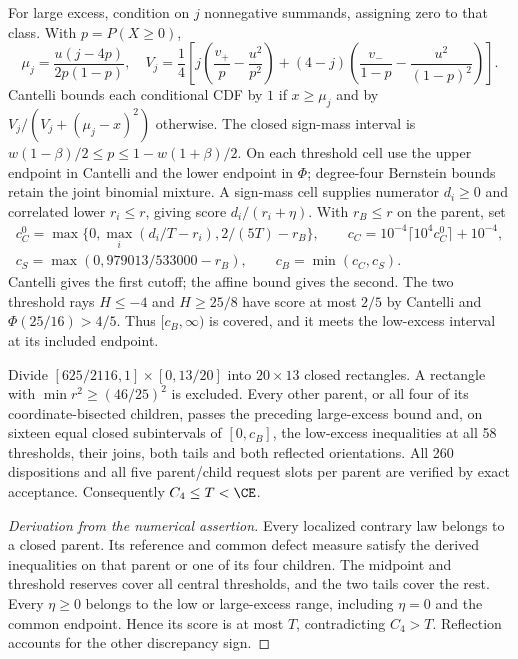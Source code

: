 For large excess, condition on $j$ nonnegative summands, assigning
zero to that class. With $p=P(X\ge0)$,
\[
 \mu_j=\frac{u(j-4p)}{2p(1-p)},\quad
 V_j=\frac14\left[j\left(\frac{v_+}{p}-\frac{u^2}{p^2}\right)
 +(4-j)\left(\frac{v_-}{1-p}-\frac{u^2}{(1-p)^2}\right)\right].
\]
Cantelli bounds each conditional CDF by $1$ if $x\ge\mu_j$ and by
$V_j/(V_j+(\mu_j-x)^2)$ otherwise. The closed sign-mass interval is
$w(1-\beta)/2\le p\le1-w(1+\beta)/2$.
On each threshold cell use the upper endpoint in Cantelli and the
lower endpoint in $\Phi$; degree-four Bernstein bounds retain the
joint binomial mixture. A sign-mass cell supplies numerator $d_i\ge0$
and correlated lower $r_i\le r$, giving score $d_i/(r_i+\eta)$.
With $r_B\le r$ on the parent, set
\begin{gather*}
 c_C^0=\max\{0,\max_i(d_i/T-r_i),2/(5T)-r_B\},\qquad
 c_C=10^{-4}\lceil10^4c_C^0\rceil+10^{-4},\\
 c_S=\max(0,979013/533000-r_B),\qquad c_B=\min(c_C,c_S).
\end{gather*}
Cantelli gives the first cutoff; the affine bound gives the second.
The two threshold rays $H\le-4$ and $H\ge25/8$ have score at most
$2/5$ by Cantelli and $\Phi(25/16)>4/5$. Thus $[c_B,\infty)$ is
covered, and it meets the low-excess interval at its included endpoint.

\begin{proposition}\label{j:finite:n4numerical}
Divide $[625/2116,1]\times[0,13/20]$ into $20\times13$ closed
rectangles. A rectangle with $\min r^2\ge(46/25)^2$ is excluded.
Every other parent, or all four of its coordinate-bisected children,
passes the preceding large-excess bound and, on sixteen equal closed
subintervals of $[0,c_B]$, the low-excess inequalities at all 58
thresholds, their joins, both tails and both reflected orientations.
All 260 dispositions and all five parent/child request slots per parent
are verified by exact acceptance. Consequently $C_4\le T<\CE$.
\end{proposition}
\begin{proof}[Derivation from the numerical assertion]
Every localized contrary law belongs to a closed parent. Its reference
and common defect measure satisfy the derived inequalities on that parent
or one of its four children. The midpoint and threshold reserves cover
all central thresholds, and the two tails cover the rest.
Every $\eta\ge0$ belongs to the low or large-excess range, including
$\eta=0$ and the common endpoint. Hence its score is at most $T$,
contradicting $C_4>T$. Reflection accounts for the other discrepancy sign.
\end{proof}

